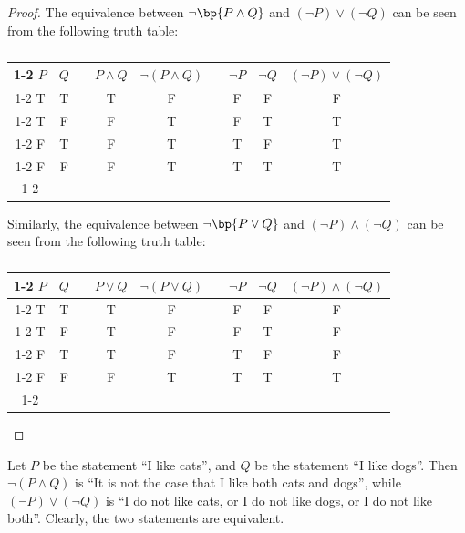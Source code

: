 \begin{proof}
    The equivalence between $\lnot \bp{P \land Q}$ and $(\lnot P) \lor (\lnot Q)$ can be seen from the following truth table:

    \begin{table}[H]
        \centering
        \begin{tabular}{|c|c|l|c|c|c|c|c|c|}
        \cline{1-2} \cline{4-5} \cline{7-9}
        $P$ & $Q$ &  & $P \land Q$ & $\lnot (P \land Q)$ &  & $\lnot P$ & $\lnot Q$ & $(\lnot P) \lor (\lnot Q)$ \\ \cline{1-2} \cline{4-5} \cline{7-9} 
        T & T &  & T & F &  & F & F & F \\ \cline{1-2} \cline{4-5} \cline{7-9} 
        T & F &  & F & T &  & F & T & T \\ \cline{1-2} \cline{4-5} \cline{7-9} 
        F & T &  & F & T &  & T & F & T \\ \cline{1-2} \cline{4-5} \cline{7-9} 
        F & F &  & F & T &  & T & T & T \\ \cline{1-2} \cline{4-5} \cline{7-9} 
        \end{tabular}
        \caption{}
    \end{table}

    Similarly, the equivalence between $\lnot \bp{P \lor Q}$ and $(\lnot P) \land (\lnot Q)$ can be seen from the following truth table:

    \begin{table}[H]
        \centering
        \begin{tabular}{|c|c|l|c|c|l|c|c|c|}
        \cline{1-2} \cline{4-5} \cline{7-9}
        $P$ & $Q$ &  & $P \lor Q$ & $\lnot (P \lor Q)$ &  & $\lnot P$ & $\lnot Q$ & $(\lnot P) \land (\lnot Q)$ \\ \cline{1-2} \cline{4-5} \cline{7-9} 
        T & T &  & T & F &  & F & F & F \\ \cline{1-2} \cline{4-5} \cline{7-9} 
        T & F &  & T & F &  & F & T & F \\ \cline{1-2} \cline{4-5} \cline{7-9} 
        F & T &  & T & F &  & T & F & F \\ \cline{1-2} \cline{4-5} \cline{7-9} 
        F & F &  & F & T &  & T & T & T \\ \cline{1-2} \cline{4-5} \cline{7-9} 
        \end{tabular}
        \caption{}
    \end{table}
\end{proof}

\begin{example}
    Let $P$ be the statement ``I like cats'', and $Q$ be the statement ``I like dogs''. Then $\lnot (P \land Q)$ is ``It is not the case that I like both cats and dogs'', while $(\lnot P) \lor (\lnot Q)$ is ``I do not like cats, or I do not like dogs, or I do not like both''. Clearly, the two statements are equivalent.
\end{example}


